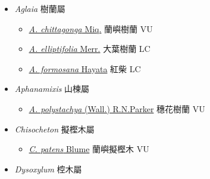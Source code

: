 
  \begin{itemize}
 \item[] \textit{Aglaia} 樹蘭屬
                                
  \begin{itemize}
        \item[] \href{http://www.theplantlist.org/tpl1.1/search?q=Aglaia+chittagonga}{\textit{A. chittagonga} Miq.}   蘭嶼樹蘭   VU
        \item[] \href{http://www.theplantlist.org/tpl1.1/search?q=Aglaia+elliptifolia}{\textit{A. elliptifolia} Merr.}   大葉樹蘭   LC
        \item[] \href{http://www.theplantlist.org/tpl1.1/search?q=Aglaia+formosana}{\textit{A. formosana} Hayata}   紅柴   LC
  \end{itemize}
 \item[] \textit{Aphanamixis} 山楝屬
                                
  \begin{itemize}
        \item[] \href{http://www.theplantlist.org/tpl1.1/search?q=Aphanamixis+polystachya}{\textit{A. polystachya} (Wall.) R.N.Parker}   穗花樹蘭   VU
  \end{itemize}
 \item[] \textit{Chisocheton} 擬樫木屬
                                
  \begin{itemize}
        \item[] \href{http://www.theplantlist.org/tpl1.1/search?q=Chisocheton+patens}{\textit{C. patens} Blume}   蘭嶼擬樫木   VU
  \end{itemize}
 \item[] \textit{Dysoxylum} 椌木屬
                                

\end{itemize}
